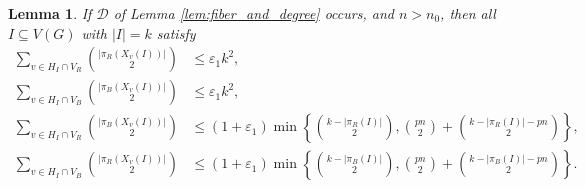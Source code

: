 \documentclass{article}
\newtheorem{lemma}[theorem]{Lemma}
\begin{document}
\begin{lemma} 
If $\mathcal{D}$ of Lemma \ref{lem:fiber_and_degree} occurs, and $n>n_0$, then all $I \subseteq V(G)$ with $|I| = k$ satisfy
\begin{align} 
\sum_{v \in H_I \cap V_R} \binom{|\pi_R(X_v(I))|}{2} &\leq \varepsilon_1 k^2\label{dim8},\\
\sum_{v \in H_I \cap V_B} \binom{|\pi_B(X_v(I))|}{2} &\leq \varepsilon_1 k^2\label{dim9},\\
\sum_{v \in H_I \cap V_R} \binom{|\pi_B(X_v(I))|}{2} &\leq (1+\varepsilon_1) \min \left\{ \binom{k-|\pi_R(I)|}{2} , \binom{pn}{2}+\binom{k-|\pi_R(I)|-pn}{2}\right\}\label{dim6},\\
\sum_{v \in H_I \cap V_B} \binom{|\pi_R(X_{v}(I))|}{2} &\leq (1+\varepsilon_1)\min\left\{ \binom{k-|\pi_B(I)|}{2} , \binom{pn}{2}+\binom{k-|\pi_B(I)|-pn}{2}\right\}\label{dim7}. 
\end{align} 
\label{lem:huge} 
\end{lemma}   
\end{document}
